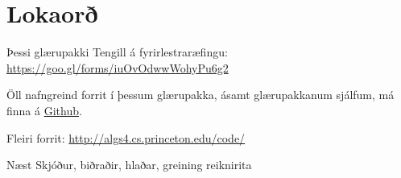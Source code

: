 \documentclass{beamer}
\begin{document}
\section{Lokaorð}

\begin{frame}{Þessi glærupakki}
Tengill á fyrirlestraræfingu: \url{https://goo.gl/forms/iuOvOdwwWohyPu6g2}
\vspace{1cm}

Öll nafngreind forrit í þessum glærupakka, ásamt glærupakkanum sjálfum, má finna á  \href{https://github.com/Ernir/kennsluefni/tree/master/T2/Code/w4}{Github}. 

Fleiri forrit: \url{http://algs4.cs.princeton.edu/code/}
\end{frame}


\begin{frame}{Næst}
Skjóður, biðraðir, hlaðar, greining reiknirita
\end{frame}
\end{document}
